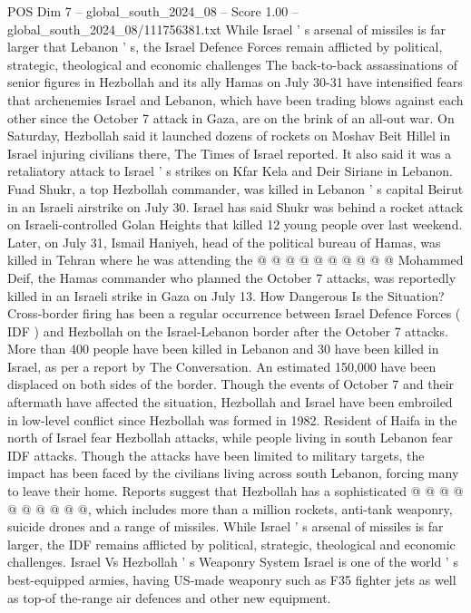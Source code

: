 \begin{textsample}{POS Dim 7 – global\_south\_2024\_08 – Score 1.00 – global\_south\_2024\_08/111756381.txt}  \label{ex:f7_pos_074}
While Israel ' s arsenal of missiles is far larger that Lebanon ' s, the Israel Defence Forces remain afflicted by political, strategic, theological and economic challenges The back-to-back assassinations of senior figures in Hezbollah and its ally Hamas on July 30-31 have intensified fears that archenemies Israel and Lebanon, which have been trading blows against each other since the October 7 attack in Gaza, are on the brink of an all-out war.
On Saturday, Hezbollah said it launched dozens of rockets on Moshav Beit Hillel in Israel injuring civilians there, The Times of Israel reported.
It also said it was a retaliatory attack to Israel ' s strikes on Kfar Kela and Deir Siriane in Lebanon.
Fuad Shukr, a top Hezbollah commander, was killed in Lebanon ' s capital Beirut in an Israeli airstrike on July 30.
Israel has said Shukr was behind a rocket attack on Israeli-controlled Golan Heights that killed 12 young people over last weekend.
Later, on July 31, Ismail Haniyeh, head of the political bureau of Hamas, was killed in Tehran where he was attending the @ @ @ @ @ @ @ @ @ @ Mohammed Deif, the Hamas commander who planned the October 7 attacks, was reportedly killed in an Israeli strike in Gaza on July 13.
How Dangerous Is the Situation?
Cross-border firing has been a regular occurrence between Israel Defence Forces ( IDF ) and Hezbollah on the Israel-Lebanon border after the October 7 attacks.
More than 400 people have been killed in Lebanon and 30 have been killed in Israel, as per a report by The Conversation.
An estimated 150,000 have been displaced on both sides of the border.
Though the events of October 7 and their aftermath have affected the situation, Hezbollah and Israel have been embroiled in low-level conflict since Hezbollah was formed in 1982.
Resident of Haifa in the north of Israel fear Hezbollah attacks, while people living in south Lebanon fear IDF attacks.
Though the attacks have been limited to military targets, the impact has been faced by the civilians living across south Lebanon, forcing many to leave their home.
Reports suggest that Hezbollah has a sophisticated @ @ @ @ @ @ @ @ @ @, which includes more than a million rockets, anti-tank weaponry, suicide drones and a range of missiles.
While Israel ' s arsenal of missiles is far larger, the IDF remains afflicted by political, strategic, theological and economic challenges.
Israel Vs Hezbollah ' s Weaponry System Israel is one of the world ' s best-equipped armies, having US-made weaponry such as F35 fighter jets as well as top-of the-range air defences and other new equipment.

\end{textsample}
